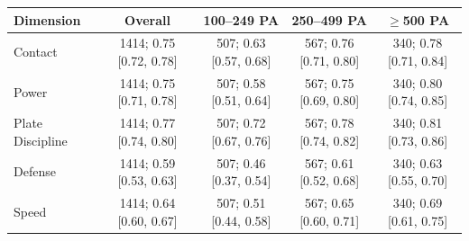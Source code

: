 \begin{tabular}{lcccc}
\toprule
Dimension & Overall & 100--249 PA & 250--499 PA & $\geq$500 PA \\
\midrule
Contact & 1414; 0.75 [0.72, 0.78] & 507; 0.63 [0.57, 0.68] & 567; 0.76 [0.71, 0.80] & 340; 0.78 [0.71, 0.84] \\
Power & 1414; 0.75 [0.71, 0.78] & 507; 0.58 [0.51, 0.64] & 567; 0.75 [0.69, 0.80] & 340; 0.80 [0.74, 0.85] \\
Plate Discipline & 1414; 0.77 [0.74, 0.80] & 507; 0.72 [0.67, 0.76] & 567; 0.78 [0.74, 0.82] & 340; 0.81 [0.73, 0.86] \\
Defense & 1414; 0.59 [0.53, 0.63] & 507; 0.46 [0.37, 0.54] & 567; 0.61 [0.52, 0.68] & 340; 0.63 [0.55, 0.70] \\
Speed & 1414; 0.64 [0.60, 0.67] & 507; 0.51 [0.44, 0.58] & 567; 0.65 [0.60, 0.71] & 340; 0.69 [0.61, 0.75] \\
\bottomrule
\end{tabular}
